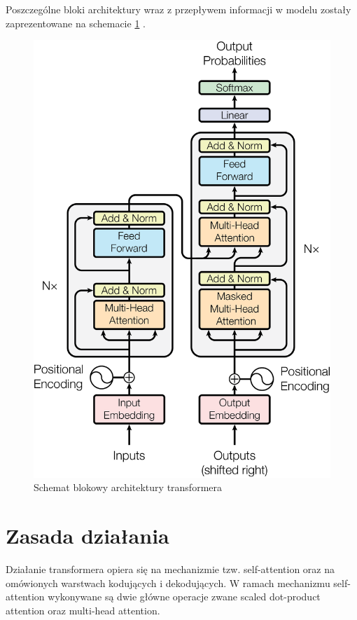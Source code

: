 Poszczególne bloki architektury wraz z przepływem informacji w modelu zostały zaprezentowane na schemacie \ref{fig:transformer_architecture} \cite{vaswani2023attentionneed}.

\begin{figure}[H]
    \centering
	\includegraphics[scale=0.20]{figs/architecture.png}
	\caption{Schemat blokowy architektury transformera}
	\label{fig:transformer_architecture}
\end{figure}

\section{Zasada działania}
Działanie transformera opiera się na mechanizmie tzw. self-attention oraz na omówionych warstwach kodujących i dekodujących.
W ramach mechanizmu self-attention wykonywane są dwie główne operacje zwane scaled dot-product attention oraz multi-head attention.

